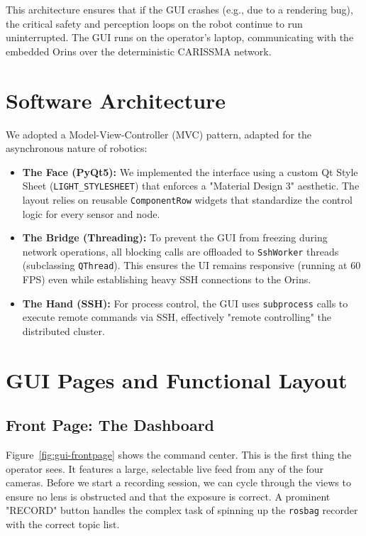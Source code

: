 \documentclass[12pt,a4paper]{report}
\begin{document}
{This architecture ensures that if the GUI crashes (e.g., due to a rendering bug), the critical safety and perception loops on the robot continue to run uninterrupted. The GUI runs on the operator's laptop, communicating with the embedded Orins over the deterministic CARISSMA network.

\section{Software Architecture}
We adopted a Model-View-Controller (MVC) pattern, adapted for the asynchronous nature of robotics:
\begin{itemize}
    \item \textbf{The Face (PyQt5):} We implemented the interface using a custom Qt Style Sheet (\texttt{LIGHT\_STYLESHEET}) that enforces a "Material Design 3" aesthetic. The layout relies on reusable \texttt{ComponentRow} widgets that standardize the control logic for every sensor and node.
    \item \textbf{The Bridge (Threading):} To prevent the GUI from freezing during network operations, all blocking calls are offloaded to \texttt{SshWorker} threads (subclassing \texttt{QThread}). This ensures the UI remains responsive (running at 60 FPS) even while establishing heavy SSH connections to the Orins.
    \item \textbf{The Hand (SSH):} For process control, the GUI uses \texttt{subprocess} calls to execute remote commands via SSH, effectively "remote controlling" the distributed cluster.
\end{itemize}

\section{GUI Pages and Functional Layout}

\subsection{Front Page: The Dashboard}
Figure~\ref{fig:gui-frontpage} shows the command center. This is the first thing the operator sees. It features a large, selectable live feed from any of the four cameras. Before we start a recording session, we can cycle through the views to ensure no lens is obstructed and that the exposure is correct. A prominent "RECORD" button handles the complex task of spinning up the \texttt{rosbag} recorder with the correct topic list.

}
\end{document}
